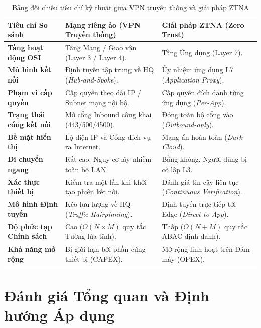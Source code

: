 \begin{table}[htbp]
\centering
\caption{Bảng đối chiếu tiêu chí kỹ thuật giữa VPN truyền thống và giải pháp ZTNA}
\label{tab:ztna_vs_vpn_comprehensive}
\small
\begin{tabular}{|p{3.2cm}|p{5.5cm}|p{5.5cm}|}
\hline
\textbf{Tiêu chí So sánh} & \textbf{Mạng riêng ảo (VPN Truyền thống)} & \textbf{Giải pháp ZTNA (Zero Trust)} \\ \hline
\textbf{Tầng hoạt động OSI} & Tầng Mạng / Giao vận (Layer 3 / Layer 4). & Tầng Ứng dụng (Layer 7). \\ \hline
\textbf{Mô hình kết nối} & Định tuyến tập trung về HQ (\textit{Hub-and-Spoke}). & Ủy nhiệm ứng dụng L7 (\textit{Application Proxy}). \\ \hline
\textbf{Phạm vi cấp quyền} & Cấp quyền theo dải IP / Subnet mạng nội bộ. & Cấp quyền đích danh từng ứng dụng (\textit{Per-App}). \\ \hline
\textbf{Trạng thái cổng kết nối} & Mở cổng Inbound công khai (443/500/4500). & Đóng toàn bộ cổng vào (\textit{Outbound-only}). \\ \hline
\textbf{Bề mặt hiển thị} & Lộ diện IP và Cổng dịch vụ ra Internet. & Mạng ẩn hoàn toàn (\textit{Dark Cloud}). \\ \hline
\textbf{Di chuyển ngang} & Rất cao. Nguy cơ lây nhiễm toàn bộ LAN. & Bằng không. Người dùng bị cô lập L3. \\ \hline
\textbf{Xác thực thiết bị} & Kiểm tra một lần khi khởi tạo phiên kết nối. & Đánh giá tin cậy liên tục (\textit{Continuous Verification}). \\ \hline
\textbf{Mô hình Định tuyến} & Kéo lưu lượng về HQ (\textit{Traffic Hairpinning}). & Định tuyến trực tiếp tới Edge (\textit{Direct-to-App}). \\ \hline
\textbf{Độ phức tạp Chính sách} & Cao ($O(N \times M)$ quy tắc Tường lửa tĩnh). & Thấp ($O(N + M)$ quy tắc ABAC định danh). \\ \hline
\textbf{Khả năng mở rộng} & Bị giới hạn bởi phần cứng thiết bị (CAPEX). & Mở rộng linh hoạt trên Đám mây (OPEX). \\ \hline
\end{tabular}
\end{table}

\section{Đánh giá Tổng quan và Định hướng Áp dụng}
\label{sec:4_4}

